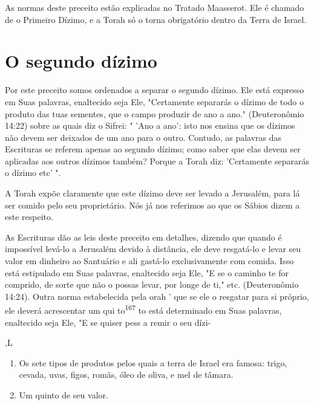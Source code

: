 \begin{itemize}
\begin{enumrate}
\begin{itemize}
\begin{itemize}
\begin{itemize}
As normas deste preceito estão explicadas no Tratado Maasserot. Ele é
chamado de o Primeiro Dízimo, e a Torah só o torna obrigatório dentro da
Terra de Israel.

\section{O segundo dízimo}

Por este preceito somos ordenados a separar o segundo dízimo. Ele está
expresso em Suas palavras, enaltecido seja Ele, "Certamente separarás o
dízimo de todo o produto das tuas sementes, que o campo produzir de ano
a ano." (Deuteronômio 14:22) sobre as quais diz o Sifrei: " 'Ano a ano':
isto nos ensina que os dízimos não devem ser deixados de um ano para o
outro. Contudo, as palavras das Escrituras se referem apenas ao segundo
dízimo; co­mo saber que elas devem ser aplicadas aos outros dízimos
também? Porque a Torah diz: 'Certamente separarás o dízimo etc' ".

A Torah expõe claramente que este dízimo deve ser levado a Jerusa­lém,
para lá ser comido pelo seu proprietário. Nós já nos referimos ao que os
Sábios dizem a este respeito.

As Escrituras dão as leis deste preceito em detalhes, dizendo que
quan­do é impossível levá-lo a Jerusalém devido à distância, ele deve
resgatá-lo e le­var seu valor em dinheiro ao Santuário e ali gastá-lo
exclusivamente com comi­da. Isso está estipulado em Suas palavras,
enaltecido seja Ele, "E se o caminho te for comprido, de sorte que não o
possas levar, por longe de ti," etc. (Deuteronômio 14:24). Outra norma
estabelecida pela orah ' que se ele o res­gatar para si próprio, ele
deverá acrescentar um qui to\textsuperscript{167} to está determi­nado
em Suas palavras, enaltecido seja Ele, "E se quiser pess a remir o seu
dízi-

{,L}


\begin{enumerate}
\def\labelenumi{\arabic{enumi}.}
\setcounter{enumi}{165}
\item
 
 Os sete tipos de produtos pelos quais a terra de Israel era famosa:
 trigo, cevada, uvas, figos, romãs, óleo de oliva, e mel de tâmara.
 
\item
 
 Um quinto de seu valor.
 
\end{enumerate}


\end{itemize}
\end{itemize}
\end{itemize}
\end{enumrate}
\end{itemize}
